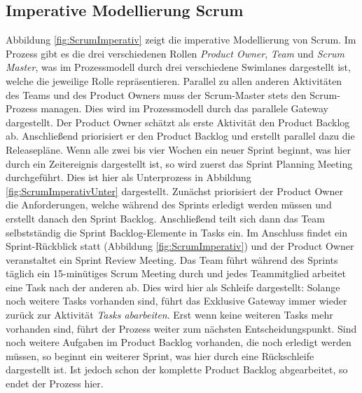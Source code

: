 \subsection{Imperative Modellierung Scrum}

Abbildung \ref{fig:ScrumImperativ} zeigt die imperative Modellierung von Scrum. \newline
Im Prozess gibt es die drei verschiedenen Rollen \textit{Product Owner}, \textit{Team} und \textit{Scrum Master}, was im Prozessmodell durch drei verschiedene Swimlanes dargestellt ist, welche die jeweilige Rolle repräsentieren.\newline
Parallel zu allen anderen Aktivitäten des Teams und des Product Owners muss der Scrum-Master stets den Scrum-Prozess managen. Dies wird im Prozessmodell durch das parallele Gateway dargestellt. \newline
Der Product Owner schätzt als erste Aktivität den Product Backlog ab. Anschließend priorisiert er den Product Backlog und erstellt parallel dazu die Releasepläne. \newline
Wenn alle zwei bis vier Wochen ein neuer Sprint beginnt, was hier durch ein Zeitereignis dargestellt ist, so wird zuerst das Sprint Planning Meeting durchgeführt. Dies ist hier als Unterprozess in Abbildung \ref{fig:ScrumImperativUnter} dargestellt. Zunächst priorisiert der Product Owner die Anforderungen, welche während des Sprints erledigt werden müssen und erstellt danach den Sprint Backlog. Anschließend teilt sich dann das Team selbstständig die Sprint Backlog-Elemente in Tasks ein.\newline
Im Anschluss findet ein Sprint-Rückblick statt (Abbildung \ref{fig:ScrumImperativ}) und der Product Owner veranstaltet ein Sprint Review Meeting.\newline
Das Team führt während des Sprints täglich ein 15-minütiges Scrum Meeting durch und jedes Teammitglied arbeitet eine Task nach der anderen ab. Dies wird hier als Schleife dargestellt: Solange noch weitere Tasks vorhanden sind, führt das Exklusive Gateway immer wieder zurück zur Aktivität \textit{Tasks abarbeiten}. Erst wenn keine weiteren Tasks mehr vorhanden sind, führt der Prozess weiter zum nächsten Entscheidungspunkt.\newline
Sind noch weitere Aufgaben im Product Backlog vorhanden, die noch erledigt werden müssen, so beginnt ein weiterer Sprint, was hier durch eine Rückschleife dargestellt ist. Ist jedoch schon der komplette Product Backlog abgearbeitet, so endet der Prozess hier.


